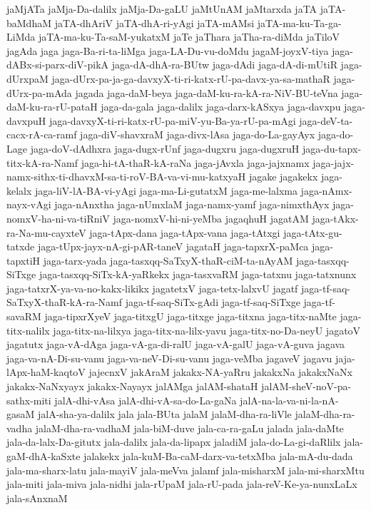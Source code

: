 {jaMjATa
jaMja-Da-dalilx
jaMja-Da-gaLU
jaMtUnAM
jaMtarxda
jaTA
jaTA-baMdhaM
jaTA-dhAriV
jaTA-dhA-ri-yAgi
jaTA-mAMsi
jaTA-ma-ku-Ta-ga-LiMda
jaTA-ma-ku-Ta-saM-yukatxM
jaTe
jaThara
jaTha-ra-diMda
jaTiloV
jagAda
jaga
jaga-Ba-ri-ta-liMga
jaga-LA-Du-vu-doMdu
jagaM-joyxV-tiya
jaga-dABx-si-parx-diV-pikA
jaga-dA-dhA-ra-BUtw
jaga-dAdi
jaga-dA-di-mUtiR
jaga-dUrxpaM
jaga-dUrx-pa-ja-ga-davxyX-ti-ri-katx-rU-pa-davx-ya-sa-mathaR
jaga-dUrx-pa-mAda
jagada
jaga-daM-beya
jaga-daM-ku-ra-kA-ra-NiV-BU-teVna
jaga-daM-ku-ra-rU-pataH
jaga-da-gala
jaga-dalilx
jaga-darx-kASxya
jaga-davxpu
jaga-davxpuH
jaga-davxyX-ti-ri-katx-rU-pa-miV-yu-Ba-ya-rU-pa-mAgi
jaga-deV-ta-cacx-rA-ca-ramf
jaga-diV-shavxraM
jaga-divx-lAsa
jaga-do-La-gayAyx
jaga-do-Lage
jaga-doV-dAdhxra
jaga-dugx-rUnf
jaga-dugxru
jaga-dugxruH
jaga-du-tapx-titx-kA-ra-Namf
jaga-hi-tA-thaR-kA-raNa
jaga-jAvxla
jaga-jajxnamx
jaga-jajx-namx-sithx-ti-dhavxM-sa-ti-roV-BA-va-vi-mu-katxyaH
jagake
jagakekx
jaga-kelalx
jaga-liV-lA-BA-vi-yAgi
jaga-ma-Li-gutatxM
jaga-me-lalxma
jaga-nAmx-nayx-vAgi
jaga-nAnxtha
jaga-nUmxlaM
jaga-namx-yamf
jaga-nimxthAyx
jaga-nomxV-ha-ni-va-tiRniV
jaga-nomxV-hi-ni-yeMba
jagaqhuH
jagatAM
jaga-tAkx-ra-Na-mu-cayxteV
jaga-tApx-dana
jaga-tApx-vana
jaga-tAtxgi
jaga-tAtx-gu-tatxde
jaga-tUpx-jayx-nA-gi-pAR-taneV
jagataH
jaga-tapxrX-paMca
jaga-tapxtiH
jaga-tarx-yada
jaga-tasxqq-SaTxyX-thaR-ciM-ta-nAyAM
jaga-tasxqq-SiTxge
jaga-tasxqq-SiTx-kA-yaRkekx
jaga-tasxvaRM
jaga-tatxnu
jaga-tatxnunx
jaga-tatxrX-ya-va-no-kakx-likikx
jagatetxV
jaga-tetx-lalxvU
jagatf
jaga-tf-saq-SaTxyX-thaR-kA-ra-Namf
jaga-tf-saq-SiTx-gAdi
jaga-tf-saq-SiTxge
jaga-tf-savaRM
jaga-tipxrXyeV
jaga-titxgU
jaga-titxge
jaga-titxna
jaga-titx-naMte
jaga-titx-nalilx
jaga-titx-na-lilxya
jaga-titx-na-lilx-yavu
jaga-titx-no-Da-neyU
jagatoV
jagatutx
jaga-vA-dAga
jaga-vA-ga-di-ralU
jaga-vA-galU
jaga-vA-guva
jagava
jaga-va-nA-Di-su-vanu
jaga-va-neV-Di-su-vanu
jaga-veMba
jagaveV
jagavu
jaja-lApx-haM-kaqtoV
jajecnxV
jakAraM
jakakx-NA-yaRru
jakakxNa
jakakxNaNx
jakakx-NaNxyayx
jakakx-Nayayx
jalAMga
jalAM-shataH
jalAM-sheV-noV-pa-sathx-miti
jalA-dhi-vAsa
jalA-dhi-vA-sa-do-La-gaNa
jalA-na-la-va-ni-la-nA-gasaM
jalA-sha-ya-dalilx
jala
jala-BUta
jalaM
jalaM-dha-ra-liVle
jalaM-dha-ra-vadha
jalaM-dha-ra-vadhaM
jala-biM-duve
jala-ca-ra-gaLu
jalada
jala-daMte
jala-da-lalx-Da-gitutx
jala-dalilx
jala-da-lipapx
jaladiM
jala-do-La-gi-daRlilx
jala-gaM-dhA-kaSxte
jalakekx
jala-kuM-Ba-caM-darx-va-tetxMba
jala-mA-du-dada
jala-ma-sharx-latu
jala-mayiV
jala-meVva
jalamf
jala-misharxM
jala-mi-sharxMtu
jala-miti
jala-miva
jala-nidhi
jala-rUpaM
jala-rU-pada
jala-reV-Ke-ya-nunxLaLx
jala-sAnxnaM
}
